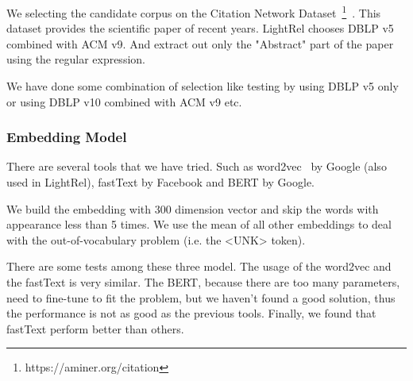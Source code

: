 We selecting the candidate corpus on the Citation Network Dataset~\footnote{https://aminer.org/citation}~\cite{Tang:08KDD}. This dataset provides the scientific paper of recent years. LightRel chooses DBLP  v5 combined with ACM v9. And extract out only the "Abstract" part of the paper using the regular expression.

We have done some combination of selection like testing by using DBLP v5 only or using DBLP v10 combined with ACM v9 etc.

\subsubsection{Embedding Model}
\label{sec:embedding_model}

There are several tools that we have tried. Such as word2vec~\cite{NIPS2013_5021} by Google (also used in LightRel), fastText by Facebook and BERT by Google.

We build the embedding with 300 dimension vector and skip the words with appearance less than 5 times. We use the mean of all other embeddings to deal with the out-of-vocabulary problem (i.e. the <UNK> token).

There are some tests among these three model. The usage of the word2vec and the fastText is very similar. The BERT, because there are too many parameters, need to fine-tune to fit the problem, but we haven't found a good solution, thus the performance is not as good as the previous tools. Finally, we found that fastText perform better than others.